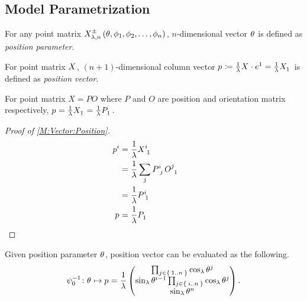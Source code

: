 \documentclass[../methodology.tex]{subfiles}
\begin{document}
\subsection{Model Parametrization}
\begin{definition}\label{M:Parameter}
    For any point matrix \(\tensor{X^\pm_{\lambda,n}\left(\theta,\phi_1,\phi_2,\dots,\phi_n\right)}{}\),
    \(n\)-dimensional vector \(\tensor{\theta}{}\)
    is defined as \textit{position parameter}.
\end{definition}
\begin{definition}\label{M:Vector}
    For point matrix \(\tensor{X}{}\),
    \(\left(n+1\right)\)-dimensional column vector \(\tensor{p}{}\coloneqq\frac{1}{\lambda}\tensor{X}{}\cdot\tensor{e}{^1}=\frac{1}{\lambda}\tensor{X}{_1}\)
    is defined as \textit{position vector}.
\end{definition}
\begin{lemma}\label{M:Vector:Position}
    For point matrix \(X=PO\)
    where \(P\) and \(O\) are position and orientation matrix respectively,
    \(\tensor{p}{}=\frac{1}{\lambda}\tensor{X}{_1}=\frac{1}{\lambda}\tensor{P}{_1}\).
\end{lemma}
\begin{proof}[Proof of \cref{M:Vector:Position}]
    \begin{align*}
        \tensor{p}{^i}
         & =\frac{1}{\lambda}\tensor{X}{^i_1}                                       \\
         & =\frac{1}{\lambda}\sum_j{\tensor{P}{^i_j}\tensor{O}{^j_1}}               \\
         & =\frac{1}{\lambda}\tensor{P}{^i_1}                                       \\
        \tensor{p}{}
         & =\frac{1}{\lambda}\tensor{P}{_1}                           &  & \qedhere
    \end{align*}
\end{proof}
\begin{lemma}\label{M:Vector:Value}
    Given position parameter \(\tensor{\theta}{}\), position vector can be evaluated as the following.
    \[
        \psi_0^{-1}\colon\tensor{\theta}{}\mapsto\tensor{p}{}
        =\frac{1}{\lambda}
        \begin{pmatrix}
            \prod_{j\in\Set{1..n}}{\cos_\lambda{\tensor{\theta}{^j}}}                                      \\
            \sin_\lambda{\tensor{\theta}{^{i-1}}}\prod_{j\in\Set{i..n}}{\cos_\lambda{\tensor{\theta}{^j}}} \\
            \sin_\lambda{{\tensor{\theta}{^n}}}                                                            \\
        \end{pmatrix}\text{.}
    \]
\end{lemma}
\end{document}
